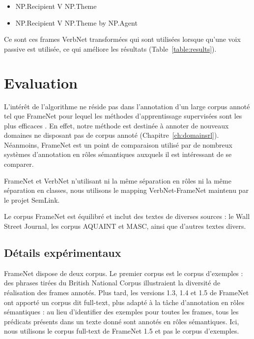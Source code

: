 \begin{itemize}
    \item NP.Recipient V NP.Theme
    \item NP.Recipient V NP.Theme by NP.Agent
\end{itemize}

Ce sont ces frames VerbNet transformées qui sont utilisées lorsque qu'une voix
passive est utilisée, ce qui améliore les résultats (Table~\ref{table:results}).

\section{Evaluation}
\label{srl:evaluation}

L'intérêt de l'algorithme ne réside pas dans l'annotation d'un large corpus
annoté tel que FrameNet pour lequel les méthodes d'apprentissage supervisées
sont les plus efficaces \citep{das2014frame}. En effet, notre méthode est
destinée à annoter de nouveaux domaines ne disposant pas de corpus annoté
(Chapitre~\ref{ch:domainsrl}). Néanmoins, FrameNet est un point de comparaison
utilisé par de nombreux systèmes d'annotation en rôles sémantiques auxquels il
est intéressant de se comparer.

FrameNet et VerbNet n'utilisant ni la même séparation en rôles ni la même
séparation en classes, nous utilisons le mapping VerbNet-FrameNet maintenu par
le projet SemLink.

Le corpus FrameNet est équilibré et inclut des textes de diverses sources : le
Wall Street Journal, les corpus AQUAINT et MASC, ainsi que d'autres textes
divers.

\subsection{Détails expérimentaux}
\label{subsec:details_exp}

FrameNet dispose de deux corpus. Le premier corpus est le corpus d'exemples :
des phrases tirées du British National Corpus illustraient la diversité de
réalisation des frames annotés. Plus tard, les versions 1.3, 1.4 et 1.5 de
FrameNet ont apporté un corpus dit full-text, plus adapté à la tâche
d'annotation en rôles sémantiques : au lieu d'identifier des exemples pour
toutes les frames, tous les prédicats présents dans un texte donné sont annotés
en rôles sémantiques. Ici, nous utilisons le corpus full-text de FrameNet 1.5
et pas le corpus d'exemples.


